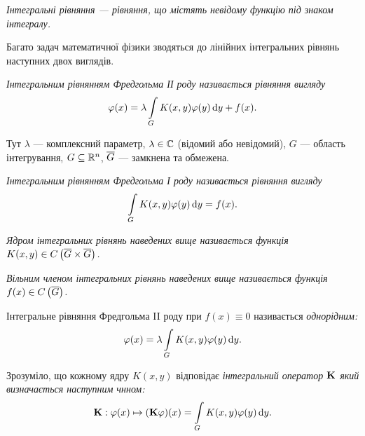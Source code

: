 \begin{definition}
	\it{Інтегральні рівняння} --- рівняння, що містять невідому функцію під знаком інтегралу.
\end{definition}

Багато задач математичної фізики зводяться до лінійних інтегральних рівнянь наступних двох виглядів.

\begin{definition}
	\it{Інтегральним рівнянням Фредгольма ІІ роду} називається рівняння вигляду
	\begin{equation}
		\phi(x) = \lambda \Int_G K(x, y) \phi(y) \diff y + f(x).
	\end{equation}
\end{definition}

Тут $\lambda$ --- комплексний параметр, $\lambda \in \CC$ (відомий або невідомий), $G$ --- область інтегрування, $G \subseteq \RR^n$, $\oG$ --- замкнена та обмежена.

\begin{definition}
	\it{Інтегральним рівнянням Фредгольма І роду} називається рівняння вигляду
	\begin{equation}
		\Int_G K(x, y) \phi(y) \diff y = f(x).
	\end{equation}
\end{definition}

\begin{definition}
	\it{Ядром} інтегральних рівнянь наведених вище називається функція $K(x, y) \in \CoGoG$.
\end{definition}

\begin{definition}
	\it{Вільним \allowbreak членом} інтегральних рівнянь наведених вище називається функція $f(x) \in \CoG$.
\end{definition}

\begin{definition}
	Інтегра\-льне рівняння Фредгольма II роду при $f(x) \equiv 0$ називається \it{однорідним}:
	\begin{equation}
		\phi(x) = \lambda \Int_G K(x, y) \phi(y) \diff y.
	\end{equation}
\end{definition}

\begin{definition}
	Зрозуміло, що кожному ядру $K(x, y)$ відповідає \it{інтегральний оператор} $\bf{K}$ який визначається наступним чнном:
	\begin{equation}
		\bf{K}: \phi(x) \mapsto (\bf{K} \phi)(x) = \Int_G K(x, y) \phi(y) \diff y.
	\end{equation}
\end{definition}

